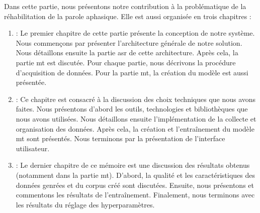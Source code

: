 Dans cette partie, nous présentons notre contribution à la problématique de la réhabilitation de la parole aphasique.
Elle est aussi organisée en trois chapitres :
\begin{enumerate}[label=Chapitre \arabic*,resume]
    \item {} :
    Le premier chapitre de cette partie présente la conception de notre système.
    Nous commençons par présenter l'architecture générale de notre solution.
    Nous détaillons ensuite la partie \gls{asr} de cette architecture.
    Après cela, la partie \gls{mt} est discutée.
    Pour chaque partie, nous décrivons la procédure d'acquisition de données. 
    Pour la partie \gls{mt}, la création du modèle est aussi présentée.
    
    \item {} :
    Ce chapitre est consacré à la discussion des choix techniques que nous avons faites.
    Nous présentons d'abord les outils, technologies et bibliothèques que nous avons utilisées.
    Nous détaillons ensuite l'implémentation de la collecte et organisation des données.
    Après cela, la création et l'entraînement du modèle \gls{mt} sont présentés.
    Nous terminons par la présentation de l'interface utilisateur.
    
    \item {} :
    Le dernier chapitre de ce mémoire est une discussion des résultats obtenus 
    (notamment dans la partie \gls{mt}).
    D'abord, la qualité et les caractéristiques des données genrées et du corpus créé sont discutées.
    Ensuite, nous présentons et commentons les résultats de l'entraînement.
    Finalement, nous terminons avec les résultats du réglage des hyperparamètres.
\end{enumerate}

